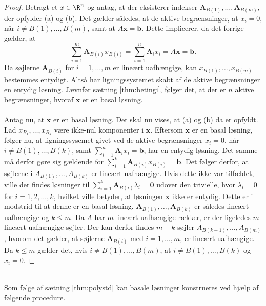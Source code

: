 \begin{proof}
Betragt et $x \in \R^n$ og antag, at der eksisterer indekser $\mathbf{A}_{B(1)},\ldots,\mathbf{A}_{B(m)}$, der opfylder (a) og (b).
%
Det gælder således, at de aktive begrænsninger, at $x_i=0$, når $i\neq B(1),\ldots,B(m)$, samt at $A\mathbf{x}=\mathbf{b}$.
Dette implicerer, da det forrige gælder,  at 
%
$$\sum_{i=1}^{m}\textbf{A}_{B(i)}x_{B(i)}=\sum_{i=1}^{n}\textbf{A}_ix_i=A\textbf{x}=\textbf{b}.$$
%
Da søjlerne $\textbf{A}_{B(i)}$ for $i=1,\ldots,m$ er lineært uafhængige, kan $x_{B(1)},\ldots,x_{B(m)}$ bestemmes entydigt. 
Altså har ligningssystemet skabt af de aktive begrænsninger en entydig løsning.
Jævnfør sætning \ref{thm:betingi},
følger det, at der er $n$ aktive begrænsninger, hvoraf $\mathbf{x}$ er en basal løsning. 
\\\\
%
%
Antag nu, at $\mathbf{x}$ er en basal løsning. 
Det skal nu vises, at (a) og (b) da er opfyldt.
Lad $x_{B_1},\ldots,x_{B_k}$ være ikke-nul komponenter i $\textbf{x}$.
Eftersom $\mathbf{x}$ er en basal løsning, følger nu, at ligningssysemet givet ved de aktive begrænsninger $x_i=0$, når $i\neq B(1),\ldots,B(k)$, samt  $\sum_{i=1}^{n}\mathbf{A}_ix_i=\mathbf{b}$, har en entydig løsning. 
Det samme må derfor gøre sig gældende for $\sum_{i=1}^{k}\mathbf{A}_{B(i)}x_{B(i)}=\mathbf{b}$.
Det følger derfor, at søjlerne i $A_{B(1)},\ldots,A_{B(k)}$ er lineært uafhængige.
%
Hvis dette ikke var tilfældet, ville der findes løsninger til $\sum_{i=1}^{k}\mathbf{A}_{B(i)} \lambda_i=\mathbf{0}$ udover den trivielle, hvor $\lambda_i=0$ for $i=1,2,\ldots,k$, hvilket ville betyder, at løsningen $\mathbf{x}$ ikke er entydig. 
Dette er i modstrid til at denne er en basal løsning.
$\mathbf{A}_{B(1)},\ldots ,\mathbf{A}_{B(k)}$ er således lineært uafhængige og $k \leq m$.
Da $A$ har $m$ lineært uafhængige rækker, er der ligeledes $m$ lineært uafhængige søjler.
Der kan derfor findes $m-k$ søjler $A_{B(k+1)},\ldots,A_{B(m)}$, hvorom det gælder, at søjlerne $\mathbf{A}_{B(i)}$ med $i=1,\ldots,m$, er lineært uafhængige.
Da $k \leq m$ gælder det, hvis $i \neq B(1),\ldots,B(m)$, at $i \neq B(1),\ldots,B(k)$ og $x_i=0$.
%
\end{proof}
\\
\noindent
Som følge af sætning \ref{thm:polystd} kan basale løsninger konstrueres ved hjælp af følgende procedure.
